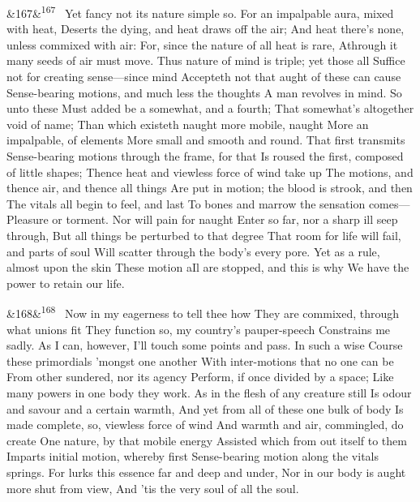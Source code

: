 \documentclass[12pt]{article}
\newcommand{\para}[1][]{\par\noindent\ifx&#1&\else\textsuperscript{\footnotesize #1}~\fi}
\begin{document}
\para[167] Yet fancy not its nature simple so. For an impalpable aura, mixed with heat, Deserts the dying, and heat draws off the air; And heat there's none, unless commixed with air: For, since the nature of all heat is rare, Athrough it many seeds of air must move. Thus nature of mind is triple; yet those all Suffice not for creating sense---since mind Accepteth not that aught of these can cause Sense-bearing motions, and much less the thoughts A man revolves in mind. So unto these Must added be a somewhat, and a fourth; That somewhat's altogether void of name; Than which existeth naught more mobile, naught More an impalpable, of elements More small and smooth and round. That first transmits Sense-bearing motions through the frame, for that Is roused the first, composed of little shapes; Thence heat and viewless force of wind take up The motions, and thence air, and thence all things Are put in motion; the blood is strook, and then The vitals all begin to feel, and last To bones and marrow the sensation comes--- Pleasure or torment. Nor will pain for naught Enter so far, nor a sharp ill seep through, But all things be perturbed to that degree That room for life will fail, and parts of soul Will scatter through the body's every pore. Yet as a rule, almost upon the skin These motion aIl are stopped, and this is why We have the power to retain our life.

\para[168] Now in my eagerness to tell thee how They are commixed, through what unions fit They function so, my country's pauper-speech Constrains me sadly. As I can, however, I'll touch some points and pass. In such a wise Course these primordials 'mongst one another With inter-motions that no one can be From other sundered, nor its agency Perform, if once divided by a space; Like many powers in one body they work. As in the flesh of any creature still Is odour and savour and a certain warmth, And yet from all of these one bulk of body Is made complete, so, viewless force of wind And warmth and air, commingled, do create One nature, by that mobile energy Assisted which from out itself to them Imparts initial motion, whereby first Sense-bearing motion along the vitals springs. For lurks this essence far and deep and under, Nor in our body is aught more shut from view, And 'tis the very soul of all the soul.
\end{document}
